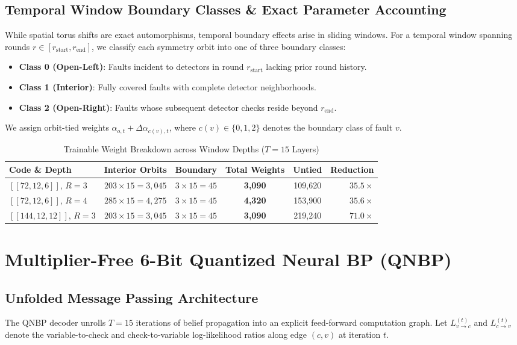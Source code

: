 \documentclass[journal]{IEEEtran}
\begin{document}
\subsection{Temporal Window Boundary Classes \& Exact Parameter Accounting}
While spatial torus shifts are exact automorphisms, temporal boundary effects arise in sliding windows. For a temporal window spanning rounds $r \in [r_{\text{start}}, r_{\text{end}}]$, we classify each symmetry orbit into one of three boundary classes:
\begin{itemize}
    \item \textbf{Class 0 (Open-Left)}: Faults incident to detectors in round $r_{\text{start}}$ lacking prior round history.
    \item \textbf{Class 1 (Interior)}: Fully covered faults with complete detector neighborhoods.
    \item \textbf{Class 2 (Open-Right)}: Faults whose subsequent detector checks reside beyond $r_{\text{end}}$.
\end{itemize}
We assign orbit-tied weights $\alpha_{o, t} + \Delta\alpha_{c(v), t}$, where $c(v) \in \{0, 1, 2\}$ denotes the boundary class of fault $v$.

\begin{table}[h]
\centering
\caption{Trainable Weight Breakdown across Window Depths ($T=15$ Layers)}
\label{tab:parameter_accounting}
\begin{tabular}{lccccr}
\hline
\textbf{Code \& Depth} & \textbf{Interior Orbits} & \textbf{Boundary} & \textbf{Total Weights} & \textbf{Untied} & \textbf{Reduction} \\
\hline
$[[72,12,6]]$, $R=3$ & $203 \times 15 = 3,045$ & $3 \times 15 = 45$ & \textbf{3,090} & 109,620 & $\mathbf{35.5\times}$ \\
$[[72,12,6]]$, $R=4$ & $285 \times 15 = 4,275$ & $3 \times 15 = 45$ & \textbf{4,320} & 153,900 & $\mathbf{35.6\times}$ \\
$[[144,12,12]]$, $R=3$ & $203 \times 15 = 3,045$ & $3 \times 15 = 45$ & \textbf{3,090} & 219,240 & $\mathbf{71.0\times}$ \\
\hline
\end{tabular}
\end{table}

\section{Multiplier-Free 6-Bit Quantized Neural BP (QNBP)}

\subsection{Unfolded Message Passing Architecture}
The QNBP decoder unrolls $T=15$ iterations of belief propagation into an explicit feed-forward computation graph. Let $L_{v \to c}^{(t)}$ and $L_{c \to v}^{(t)}$ denote the variable-to-check and check-to-variable log-likelihood ratios along edge $(c, v)$ at iteration $t$.
\end{document}
